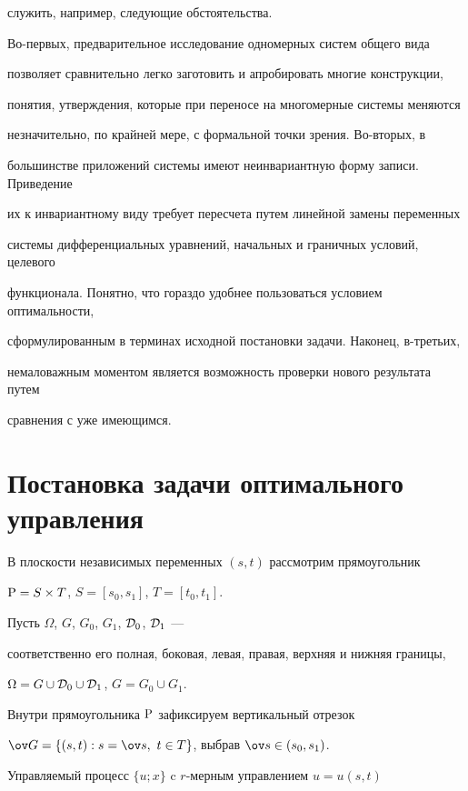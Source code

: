 служить, например, следующие обстоятельства.


Во-первых, предварительное исследование одномерных систем общего вида


позволяет сравнительно легко заготовить и апробировать многие конструкции,


понятия, утверждения, которые при переносе на многомерные системы меняются


незначительно, по крайней мере, с формальной точки зрения. Во-вторых, в


большинстве приложений системы имеют неинвариантную форму записи. Приведение


их к инвариантному виду требует пересчета путем линейной замены переменных


системы дифференциальных уравнений, начальных и граничных условий, целевого


функционала. Понятно, что гораздо удобнее пользоваться условием оптимальности,


сформулированным в терминах исходной постановки задачи. Наконец, в-третьих,


немаловажным моментом является возможность проверки нового результата путем


сравнения с уже имеющимся.





\section{Постановка задачи оптимального управления}





В плоскости независимых переменных $(s,t)$ рассмотрим прямоугольник


$\P = S \times T$, $S = [s_0,s_1]$, $T = [t_0,t_1]$.


Пусть $\Omega$, $G$, $G_0$, $G_1$, ${\cal D}_0$, ${\cal D}_1$ ---


соответственно его полная, боковая, левая, правая, верхняя и нижняя границы,


$\Omega = G \cup {\cal D}_0 \cup {\cal D}_1$, $G = G_0 \cup G_1$.


Внутри прямоугольника $\P$ зафиксируем вертикальный отрезок


$\ov G = \{ (s,t): s = \ov s,\ t \in T \}$, выбрав $\ov s \in (s_0,s_1)$. 





Управляемый процесс $\{u;x\}$ c $r$-мерным управлением $u = u(s,t)$


